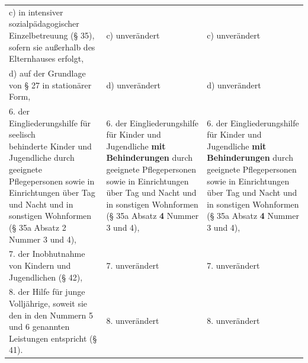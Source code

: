 \documentclass[10pt,a4paper,landscape]{article}
\begin{document}
\begin{longtable}{|L{8.2cm}|L{8.2cm}|L{8.2cm}|}
\hhline{|---|}
c)   \newline in intensiver sozialpädagogischer  \newline Einzelbetreuung (\S{} 35), sofern sie  \newline außerhalb des Elternhauses erfolgt, & c) unverändert & c) unverändert \\
\hhline{|---|}
d)   \newline auf der Grundlage von \S{} 27 in stationärer  \newline Form, & d) unverändert & d) unverändert \\
\hhline{|---|}
6.   \newline der Eingliederungshilfe für \textcolor{diffred}{seelisch  \newline behinderte} Kinder und Jugendliche durch  \newline geeignete Pflegepersonen sowie in  \newline Einrichtungen über Tag und Nacht und in  \newline sonstigen Wohnformen (\S{} 35a Absatz \textcolor{diffred}{2}  \newline Nummer 3 und 4), & 6.   \newline der Eingliederungshilfe für Kinder und  \newline Jugendliche \textbf{mit Behinderungen} durch  \newline geeignete Pflegepersonen sowie in  \newline Einrichtungen über Tag und Nacht und in  \newline sonstigen Wohnformen (\S{} 35a Absatz \textbf{4}  \newline Nummer 3 und 4), & 6.   \newline der Eingliederungshilfe für Kinder und  \newline Jugendliche \textbf{mit Behinderungen} durch  \newline geeignete Pflegepersonen sowie in  \newline Einrichtungen über Tag und Nacht und in  \newline sonstigen Wohnformen (\S{} 35a Absatz \textbf{4}  \newline Nummer 3 und 4), \\
\hhline{|---|}
7.   \newline der Inobhutnahme von Kindern und  \newline Jugendlichen (\S{} 42), & 7. unverändert & 7. unverändert \\
\hhline{|---|}
8.   \newline der Hilfe für junge Volljährige, soweit sie  \newline den in den Nummern 5 und 6 genannten  \newline Leistungen entspricht (\S{} 41). & 8. unverändert & 8. unverändert \\

\end{longtable}
\end{document}
